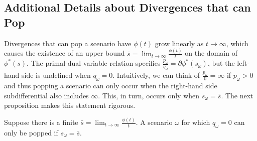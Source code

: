 \documentclass[opre,nonblindrev]{informs3} %
\begin{document}
\subsection{Additional Details about Divergences that can Pop}
\label{ssec:pop}

Divergences that can pop a scenario have $\phi(t)$ grow linearly as $t \rightarrow \infty$, which causes the existence of an upper bound $\bar{s} = \lim_{t \rightarrow \infty} \frac{\phi(t)}{t}$ on the domain of $\phi^*(s)$.
The primal-dual variable relation specifies $\frac{p_\omega}{q_\omega} = \partial \phi^*(s_\omega)$, but the left-hand side is undefined when $q_\omega = 0$.
Intuitively, we can think of $\frac{p_\omega}{0} = \infty$ if $p_\omega > 0$ and thus popping a scenario can only occur when the right-hand side subdifferential also includes $\infty$.
This, in turn, occurs only when $s_\omega = \bar{s}$.
The next proposition makes this statement rigorous.

\begin{proposition} \label{prop:pop}
	Suppose there is a finite $\bar{s} = \lim_{t \rightarrow \infty} \frac{\phi(t)}{t}$.
	A scenario $\omega$ for which $q_\omega = 0$ can only be popped if $s_\omega = \bar{s}$.
\end{proposition}
\end{document}
